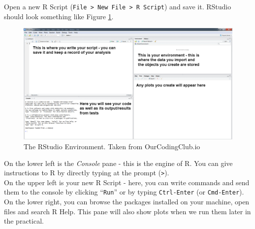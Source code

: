 \documentclass[a4paper,12pt]{article}
\begin{document}
Open a new R Script (\texttt{File > New File > R Script}) and save it. RStudio should look something like Figure \ref{fig:R_Studio}. 
\\


\begin{figure}[h]
	\centering 
	\includegraphics[width=1.1\textwidth]{figs/R_Studio.png}
	\caption{The RStudio Environment. Taken from OurCodingClub.io}
	\label{fig:R_Studio}
\end{figure} 

On the lower left is the \textit{Console} pane - this is the engine of R. You can give instructions to R by directly typing at the prompt (\texttt{>}). 
\\

On the upper left is your new R Script - here, you can write commands and send them to the console by clicking ``\texttt{Run}'' or by typing \texttt{Ctrl-Enter} (or \texttt{Cmd-Enter}). 
\\

On the lower right, you can browse the packages installed on your machine, open files and search R Help. This pane will also show plots when we run them later in the practical.
\\

\end{document}

